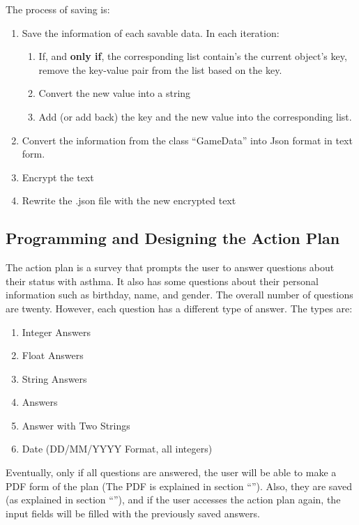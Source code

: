 The process of saving is:

\begin{enumerate}
\item{Save the information of each savable data. In each iteration:}
\begin{enumerate}
\item{If, and \textbf{only if}, the corresponding list contain's the current object's key, remove the key-value pair from the list based on the key.}
\item{Convert the new value into a string}
\item{Add (or add back) the key and the new value into the corresponding list.}
\end{enumerate}
\item{Convert the information from the class  “{\codefont GameData}” into Json format in text form.}
\item{Encrypt the text}
\item{Rewrite the .json file with the new encrypted text}
\end{enumerate}

\subsection{Programming and Designing the Action Plan}
The action plan is a survey that prompts the user to answer questions about their status with asthma. It also has some questions about their personal information such as birthday, name, and gender. The overall number of questions are twenty. However, each question has a different type of answer. The types are:
\begin{enumerate}
    \item{Integer Answers}
    
    \item{Float Answers}
    
    \item{String Answers}
    
    \item{ Answers}
    
    \item{Answer with Two Strings}
    
    \item{Date (DD/MM/YYYY Format, all integers)}
\end{enumerate}
Eventually, only if all questions are answered, the user will be able to make a PDF form of the plan (The PDF is explained in section “\textbf{}”). Also, they are saved (as explained in section “\textbf{}”), and if the user accesses the action plan again, the input fields will be filled with the previously saved answers.

